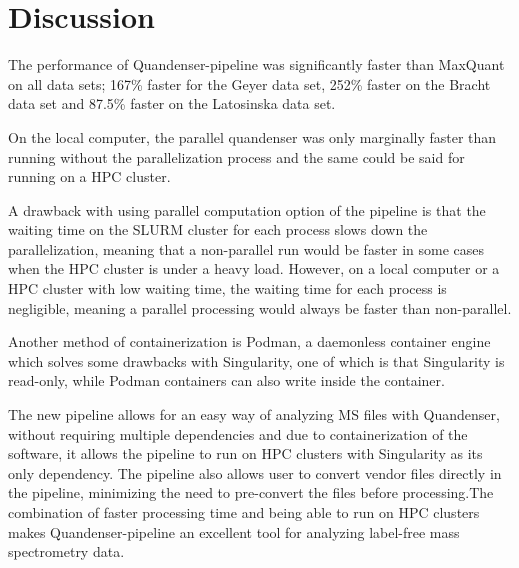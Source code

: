 \documentclass[11pt]{article}
\begin{document}
\section*{Discussion}
The performance of Quandenser-pipeline was significantly faster than MaxQuant on all data sets; 167\% faster for the Geyer data set, 252\% faster on the Bracht data set and 87.5\% faster on the Latosinska data set.

On the local computer, the parallel quandenser was only marginally faster than running without the parallelization process and the same could be said for running on a HPC cluster.

A drawback with using parallel computation option of the pipeline is that the waiting time on the SLURM cluster for each process slows down the parallelization, meaning that a non-parallel run would be faster in some cases when the HPC cluster is under a heavy load. However, on a local computer or a HPC cluster with low waiting time, the waiting time for each process is negligible, meaning a parallel processing would always be faster than non-parallel.

Another method of containerization is Podman, a daemonless container engine which solves some drawbacks with Singularity, one of which is that Singularity is read-only, while Podman containers can also write inside the container.


The new pipeline allows for an easy way of analyzing MS files with Quandenser, without requiring multiple dependencies and due to containerization of the software, it allows the pipeline to run on HPC clusters with Singularity as its only dependency. The pipeline also allows user to convert vendor files directly in the pipeline, minimizing the need to pre-convert the files before processing.The combination of faster processing time and being able to run on HPC clusters makes Quandenser-pipeline an excellent tool for analyzing label-free mass spectrometry data.



\end{document}
